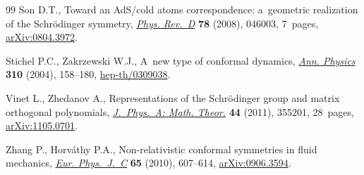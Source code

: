 \documentclass[pdftex]{sigma}
\numberwithin{equation}{section}
\begin{document}
\begin{thebibliography}{99}
Son D.T., Toward an AdS/cold atoms correspondence: a~geometric realization of the Schr\"odinger symmetry,
\href{http://dx.doi.org/10.1103/PhysRevD.78.046003}{\textit{Phys. Rev.~D}} \textbf{78} (2008), 046003, 7~pages, \href{http://arxiv.org/abs/0804.3972}{arXiv:0804.3972}.

Stichel P.C., Zakrzewski W.J., A~new type of conformal dynamics,
\href{http://dx.doi.org/10.1016/j.aop.2003.11.001}{\textit{Ann. Physics}} \textbf{310} (2004), 158--180, \href{http://arxiv.org/abs/hep-th/0309038}{hep-th/0309038}.

Vinet L., Zhedanov A., Representations of the {S}chr\"odinger group and matrix orthogonal polynomials,  \href{http://dx.doi.org/10.1088/1751-8113/44/35/355201}{\textit{J.~Phys.~A: Math. Theor.}} \textbf{44} (2011), 355201, 28~pages, \href{http://arxiv.org/abs/1105.0701}{arXiv:1105.0701}.

Zhang P., Horv\'athy P.A., Non-relativistic conformal symmetries in f\/luid mechanics,
\href{http://dx.doi.org/10.1140/epjc/s10052-009-1221-x}{\textit{Eur. Phys.~J.~C}} \textbf{65} (2010), 607--614, \href{http://arxiv.org/abs/0906.3594}{arXiv:0906.3594}.

\end{thebibliography}
\LastPageEnding
\end{document}
